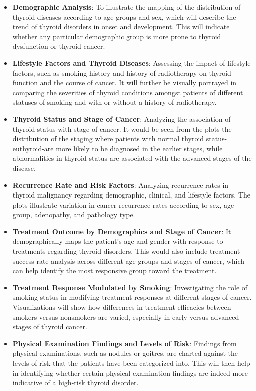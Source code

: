 \documentclass[12pt]{article}
\begin{document}
\begin{itemize}
\item \textbf{Demographic Analysis}: To illustrate the mapping of the distribution of thyroid diseases according to age groups and sex, which will describe the trend of thyroid disorders in onset and development. This will indicate whether any particular demographic group is more prone to thyroid dysfunction or thyroid cancer.

\item \textbf{Lifestyle Factors and Thyroid Diseases}: Assessing the impact of lifestyle factors, such as smoking history and history of radiotherapy on thyroid function and the course of cancer. It will further be visually portrayed in comparing the severities of thyroid conditions amongst patients of different statuses of smoking and with or without a history of radiotherapy.

\item \textbf{Thyroid Status and Stage of Cancer}: Analyzing the association of thyroid status with stage of cancer. It would be seen from the plots the distribution of the staging where patients with normal thyroid status-euthyroid-are more likely to be diagnosed in the earlier stages, while abnormalities in thyroid status are associated with the advanced stages of the disease.

\item \textbf{Recurrence Rate and Risk Factors}: Analyzing recurrence rates in thyroid malignancy regarding demographic, clinical, and lifestyle factors. The plots illustrate variation in cancer recurrence rates according to sex, age group, adenopathy, and pathology type.

\item \textbf{Treatment Outcome by Demographics and Stage of Cancer}: It demographically maps the patient's age and gender with response to treatments regarding thyroid disorders. This would also include treatment success rate analysis across different age groups and stages of cancer, which can help identify the most responsive group toward the treatment.

\item \textbf{Treatment Response Modulated by Smoking}: Investigating the role of smoking status in modifying treatment responses at different stages of cancer. Visualizations will show how differences in treatment efficacies between smokers versus nonsmokers are varied, especially in early versus advanced stages of thyroid cancer.

\item \textbf{Physical Examination Findings and Levels of Risk}: Findings from physical examinations, such as nodules or goitres, are charted against the levels of risk that the patients have been categorized into. This will then help in identifying whether certain physical examination findings are indeed more indicative of a high-risk thyroid disorder.


\end{itemize}
\end{document}
